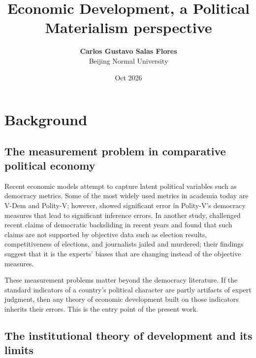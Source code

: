 \documentclass[11pt]{article}
\title{\textbf{Economic Development, a Political Materialism perspective}}
\author{\textbf{Carlos Gustavo Salas Flores} \\ \small Beijing Normal University}
\date{Oct 2026}
\begin{document}
\maketitle

\section{Background}
\label{sec:background}

\subsection{The measurement problem in comparative political economy}

Recent economic models attempt to capture latent political variables such as democracy metrics. Some of the most widely used metrics in academia today are V-Dem and Polity-V; however, \textcite{treier_jackman_2008} showed significant error in Polity-V's democracy measures that lead to significant inference errors. In another study, \textcite{little_meng_2024} challenged recent claims of democratic backsliding in recent years and found that such claims are not supported by objective data such as election results, competitiveness of elections, and journalists jailed and murdered; their findings suggest that it is the experts' biases that are changing instead of the objective measures.

These measurement problems matter beyond the democracy literature. If the standard indicators of a country's political character are partly artifacts of expert judgment, then any theory of economic development built on those indicators inherits their errors. This is the entry point of the present work.

\subsection{The institutional theory of development and its limits}
\end{document}
